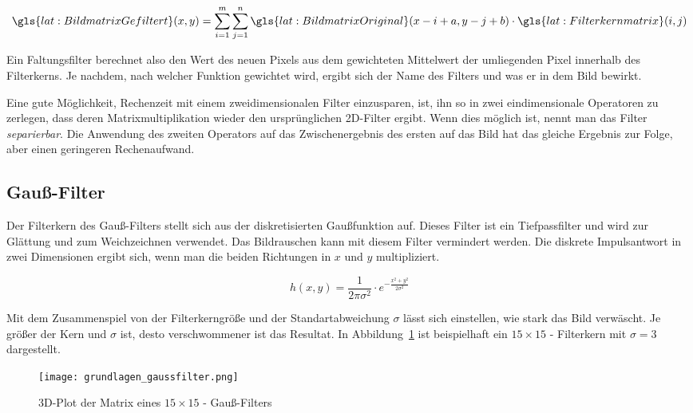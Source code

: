 \begin{equation}
\gls{lat:BildmatrixGefiltert}(x,y) = \sum_{i=1}^{m} \sum_{j=1}^{n} \gls{lat:BildmatrixOriginal}(x-i+a, y-j+b) \cdot \gls{lat:Filterkernmatrix}(i,j)
\end{equation}

Ein Faltungsfilter berechnet also den Wert des neuen Pixels aus dem gewichteten Mittelwert der umliegenden Pixel innerhalb des Filterkerns. Je nachdem, nach welcher Funktion gewichtet wird, ergibt sich der Name des Filters und was er in dem Bild bewirkt. 

Eine gute Möglichkeit, Rechenzeit mit einem zweidimensionalen Filter einzusparen, ist, ihn so in zwei eindimensionale Operatoren zu zerlegen, dass deren Matrixmultiplikation wieder den ursprünglichen 2D-Filter ergibt. Wenn dies möglich ist, nennt man das Filter \emph{separierbar}. Die Anwendung des zweiten Operators auf das Zwischenergebnis des ersten auf das Bild hat das gleiche Ergebnis zur Folge, aber einen geringeren Rechenaufwand.

\subsection{Gauß-Filter}

Der Filterkern des Gauß-Filters stellt sich aus der diskretisierten Gaußfunktion auf. Dieses Filter ist ein Tiefpassfilter und wird zur Glättung und zum Weichzeichnen verwendet. Das Bildrauschen kann mit diesem Filter vermindert werden. Die diskrete Impulsantwort in zwei Dimensionen ergibt sich, wenn man die beiden Richtungen in \( x\) und \( y \) multipliziert.

\begin{equation}
h(x,y) = \frac{1}{2\pi\sigma^2} \cdot e^{-\frac{x^2+y^2}{2\sigma^2}}
\end{equation}

Mit dem Zusammenspiel von der Filterkerngröße und der Standartabweichung \( \sigma \) lässt sich einstellen, wie stark das Bild verwäscht. Je größer der Kern und \( \sigma \) ist, desto verschwommener ist das Resultat. In Abbildung~\ref{fig:grundlagen_gaussfilter} ist beispielhaft ein \( 15\times15\) - Filterkern mit \( \sigma = 3\) dargestellt.

\begin{figure}[H] %
  \centering
  \texttt{[image: grundlagen\_gaussfilter.png]}
  \caption{3D-Plot der Matrix eines \( 15\times15\) - Gauß-Filters}
  \label{fig:grundlagen_gaussfilter}
\end{figure}  

